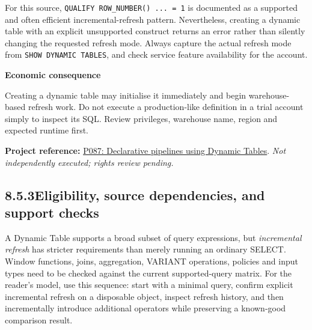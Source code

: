 \documentclass[11pt,twoside]{article}
\newcommand{\topic}[2]{\subsection*{#1\quad #2}}
\newcommand{\repo}[2]{\par\begingroup\fontsize{8.0}{9.6}\selectfont\sffamily\color{inkgray}\textbf{Project reference:} \href{#2}{#1}. \textit{Not independently executed; rights review pending.}\par\endgroup}
\begin{document}
For this source, \texttt{QUALIFY ROW\_NUMBER() ... = 1} is documented as a supported and often efficient incremental-refresh pattern. Nevertheless, creating a dynamic table with an explicit unsupported construct returns an error rather than silently changing the requested refresh mode. Always capture the actual refresh mode from \texttt{SHOW DYNAMIC TABLES}, and check service feature availability for the account.
\begin{whitebox}\textbf{Economic consequence}\par
Creating a dynamic table may initialise it immediately and begin warehouse-based refresh work. Do not execute a production-like definition in a trial account simply to inspect its SQL. Review privileges, warehouse name, region and expected runtime first.\end{whitebox}
\repo{P087: Declarative pipelines using Dynamic Tables}{https://github.com/Snowflake-Labs/sfguide-declarative-pipelines-dynamic-tables}
\newpage
\topic{8.5.3}{Eligibility, source dependencies, and support checks}
A Dynamic Table supports a broad subset of query expressions, but \emph{incremental refresh} has stricter requirements than merely running an ordinary SELECT. Window functions, joins, aggregation, VARIANT operations, policies and input types need to be checked against the current supported-query matrix. For the reader's model, use this sequence: start with a minimal query, confirm explicit incremental refresh on a disposable object, inspect refresh history, and then incrementally introduce additional operators while preserving a known-good comparison result.
\end{document}
